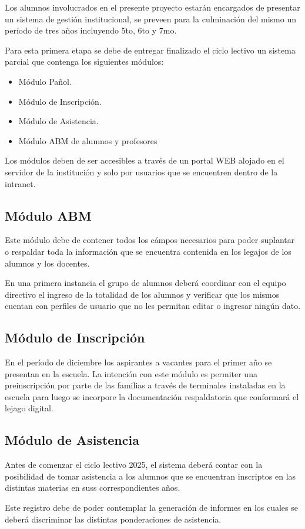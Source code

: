 Los alumnos involucrados en el presente proyecto estarán encargados de presentar un sistema de
gestión institucional, se preveen para la culminación del mismo un período de tres años 
incluyendo 5to, 6to y 7mo.

Para esta primera etapa se debe de entregar finalizado el ciclo lectivo un sistema parcial que contenga los siguientes módulos:

\begin{itemize}
    \item Módulo Pañol.
    \item Módulo de Inscripción.
    \item Módulo de Asistencia.
    \item Módulo ABM de alumnos y profesores
\end{itemize}

Los módulos deben de ser accesibles a través de un portal WEB alojado en el servidor de la institución y solo por usuarios que se encuentren dentro de la intranet.

\subsection{Módulo ABM}

Este módulo debe de contener todos los cámpos necesarios para poder suplantar o respaldar toda la información que se encuentra contenida en los legajos de los alumnos y los docentes.

En una primera instancia el grupo de alumnos deberá coordinar con el equipo directivo el ingreso de la totalidad de los alumnos y verificar que los mismos cuentan con perfiles de usuario que no les permitan editar o ingresar ningún dato.

\subsection{Módulo de Inscripción}

En el período de diciembre los aspirantes a vacantes para el primer año se presentan en la escuela. La intención con este módulo es permiter una preinscripción por parte de las familias a través de terminales instaladas en la escuela para luego se incorpore la documentación respaldatoria que conformará el lejago digital.

\subsection{Módulo de Asistencia}

Antes de comenzar el ciclo lectivo 2025, el sistema deberá contar con la posibilidad de tomar asistencia a los alumnos que se encuentran inscriptos en las distintas materias en suss correspondientes años.

Este registro debe de poder contemplar la generación de informes en los cuales se deberá discriminar las distintas ponderaciones de asistencia.